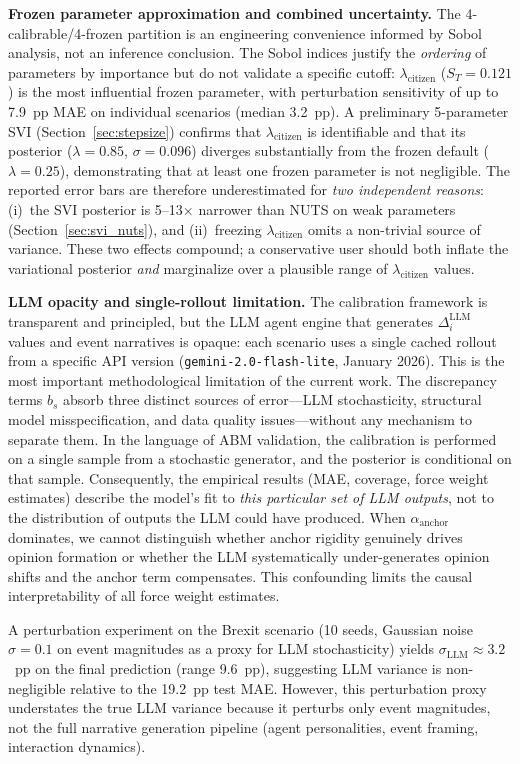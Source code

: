 \documentclass[12pt]{article}
\begin{document}
\textbf{Frozen parameter approximation and combined uncertainty.} The 4-calibrable/4-frozen partition is an engineering convenience informed by Sobol analysis, not an inference conclusion. The Sobol indices justify the \emph{ordering} of parameters by importance but do not validate a specific cutoff: $\lambda_{\text{citizen}}$ ($S_T = 0.121$) is the most influential frozen parameter, with perturbation sensitivity of up to 7.9~pp MAE on individual scenarios (median 3.2~pp). A preliminary 5-parameter SVI (Section~\ref{sec:stepsize}) confirms that $\lambda_{\text{citizen}}$ is identifiable and that its posterior ($\lambda = 0.85$, $\sigma = 0.096$) diverges substantially from the frozen default ($\lambda = 0.25$), demonstrating that at least one frozen parameter is not negligible. The reported error bars are therefore underestimated for \emph{two independent reasons}: (i)~the SVI posterior is 5--13$\times$ narrower than NUTS on weak parameters (Section~\ref{sec:svi_nuts}), and (ii)~freezing $\lambda_{\text{citizen}}$ omits a non-trivial source of variance. These two effects compound; a conservative user should both inflate the variational posterior \emph{and} marginalize over a plausible range of $\lambda_{\text{citizen}}$ values.

\textbf{LLM opacity and single-rollout limitation.} The calibration framework is transparent and principled, but the LLM agent engine that generates $\Delta^{\text{LLM}}_i$ values and event narratives is opaque: each scenario uses a single cached rollout from a specific API version (\texttt{gemini-2.0-flash-lite}, January 2026). This is the most important methodological limitation of the current work. The discrepancy terms $b_s$ absorb three distinct sources of error---LLM stochasticity, structural model misspecification, and data quality issues---without any mechanism to separate them. In the language of ABM validation, the calibration is performed on a single sample from a stochastic generator, and the posterior is conditional on that sample. Consequently, the empirical results (MAE, coverage, force weight estimates) describe the model's fit to \emph{this particular set of LLM outputs}, not to the distribution of outputs the LLM could have produced. When $\alpha_{\text{anchor}}$ dominates, we cannot distinguish whether anchor rigidity genuinely drives opinion formation or whether the LLM systematically under-generates opinion shifts and the anchor term compensates. This confounding limits the causal interpretability of all force weight estimates.

A perturbation experiment on the Brexit scenario (10 seeds, Gaussian noise $\sigma = 0.1$ on event magnitudes as a proxy for LLM stochasticity) yields $\sigma_{\text{LLM}} \approx 3.2$~pp on the final prediction (range 9.6~pp), suggesting LLM variance is non-negligible relative to the 19.2~pp test MAE. However, this perturbation proxy understates the true LLM variance because it perturbs only event magnitudes, not the full narrative generation pipeline (agent personalities, event framing, interaction dynamics).
\end{document}
